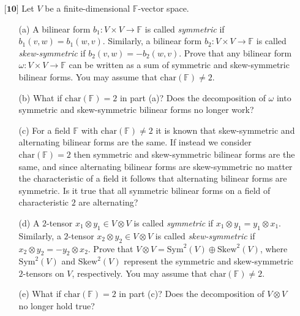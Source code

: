 \documentclass[12pt]{article}
\begin{document}
\begin{itemize}
    \newpage
    \item[$\textbf{[10]}$]
    Let $V$ be a finite-dimensional $\mathbb{F}$-vector space.
    \begin{itemize}
    
    \vspace{.3cm}
    \item[(a)]
    A bilinear form $b_1: V \times V \rightarrow \mathbb{F}$ is called \textit{symmetric} if $b_1(v,w) = b_1(w,v)$. Similarly, a bilinear form $b_2: V \times V \rightarrow \mathbb{F}$ is called \textit{skew-symmetric} if $b_2(v,w) = -b_2(w,v)$. Prove that any bilinear form $\omega: V \times V \rightarrow \mathbb{F}$ can be written as a sum of symmetric and skew-symmetric bilinear forms. You may assume that $\text{char}(\mathbb{F}) \neq 2$.
    
    \vspace{.3cm}
    \item[(b)]
    What if $\text{char}(\mathbb{F}) = 2$ in part (a)? Does the decomposition of $\omega$ into symmetric and skew-symmetric bilinear forms no longer work?
    
    \vspace{.3cm}
    \item[(c)]
    For a field $\mathbb{F}$ with $\text{char}(\mathbb{F}) \neq 2$ it is known that skew-symmetric and alternating bilinear forms are the same. If instead we consider $\text{char}(\mathbb{F}) = 2$ then symmetric and skew-symmetric bilinear forms are the same, and since alternating bilinear forms are skew-symmetric no matter the characteristic of a field it follows that alternating bilinear forms are symmetric. Is it true that all symmetric bilinear forms on a field of characteristic $2$ are alternating?
    
    \vspace{.3cm}
    \item[(d)]
    A $2$-tensor $x_1 \otimes y_1 \in V \otimes V$ is called \textit{symmetric} if $x_1 \otimes y_1 = y_1 \otimes x_1$. Similarly, a $2$-tensor $x_2 \otimes y_2 \in V \otimes V$ is called \textit{skew-symmetric} if $x_2 \otimes y_2 = -y_2 \otimes x_2$. Prove that $V \otimes V = \text{Sym}^2(V) \oplus \text{Skew}^2(V)$, where $\text{Sym}^2(V)$ and $\text{Skew}^2(V)$ represent the symmetric and skew-symmetric $2$-tensors on $V$, respectively. You may assume that $\text{char}(\mathbb{F}) \neq 2$.
    
    \vspace{.3cm}
    \item[(e)]
    What if $\text{char}(\mathbb{F}) = 2$ in part (c)? Does the decomposition of $V \otimes V$ no longer hold true?
    
    \end{itemize}
    
    \end{itemize}
\end{document}
